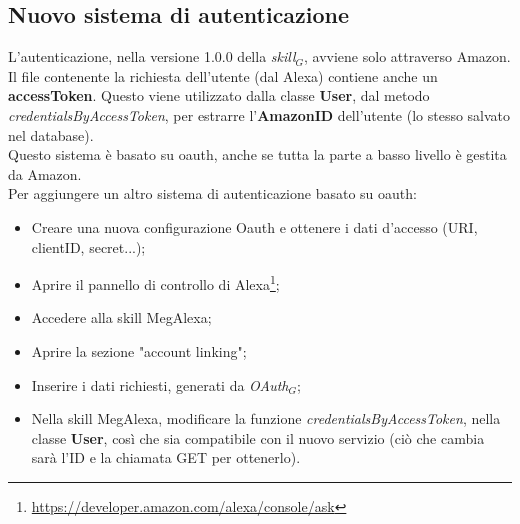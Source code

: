 \subsection{Nuovo sistema di autenticazione}\label{newAuth}
L'autenticazione, nella versione 1.0.0 della \textit{skill$_{G}$}, avviene solo attraverso Amazon.\\
Il file contenente la richiesta dell'utente (dal Alexa) contiene anche un \textbf{accessToken}. Questo viene utilizzato dalla classe \textbf{User}, dal metodo \textit{credentialsByAccessToken}, per estrarre l'\textbf{AmazonID} dell'utente (lo stesso salvato nel database).\\
Questo sistema è basato su oauth, anche se tutta la parte a basso livello è gestita da Amazon.\\
Per aggiungere un altro sistema di autenticazione basato su oauth:
\begin{itemize}
	\item Creare una nuova configurazione Oauth e ottenere i dati d'accesso (URI, clientID, secret...);
	\item Aprire il pannello di controllo di Alexa\footnote{\url{https://developer.amazon.com/alexa/console/ask}};
	\item Accedere alla skill MegAlexa;
	\item Aprire la sezione "account linking";
	\item Inserire i dati richiesti, generati da \textit{OAuth$_{G}$};
	\item Nella skill MegAlexa, modificare la funzione \textit{credentialsByAccessToken}, nella classe \textbf{User}, così che sia compatibile con il nuovo servizio (ciò che cambia sarà l'ID e la chiamata GET per ottenerlo).
\end{itemize}